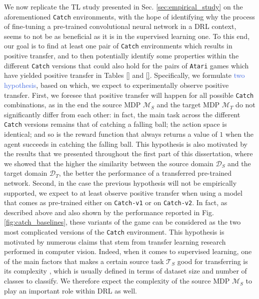 We now replicate the TL study presented in Sec. \ref{sec:empirical_study} on the aforementioned \texttt{Catch} environments, with the hope of identifying why the process of fine-tuning a pre-trained convolutional neural network in a DRL context, seems to not be as beneficial as it is in the supervised learning one. To this end, our goal is to find at least one pair of \texttt{Catch} environments which results in positive transfer, and to then potentially identify some properties within the different \texttt{Catch} versions that could also hold for the pairs of \texttt{Atari} games which have yielded positive transfer in Tables \ref{} and \ref{}. Specifically, we formulate \textcolor{RoyalBlue}{two hypothesis}, based on which, we expect to experimentally observe positive transfer. First, we foresee that positive transfer will happen for all possible \texttt{Catch} combinations, as in the end the source MDP $\mathcal{M}_S$ and the target MDP $\mathcal{M}_T$ do not significantly differ from each other: in fact, the main task across the different \texttt{Catch} versions remains that of catching a falling ball; the action space is identical; and so is the reward function that always returns a value of $1$ when the agent succeeds in catching the falling ball. This hypothesis is also motivated by the results that we presented throughout the first part of this dissertation, where we showed that the higher the similarity between the source domain $\mathcal{D}_S$ and the target domain $\mathcal{D}_T$, the better the performance of a transferred pre-trained network. Second, in the case the previous hypothesis will not be empirically supported, we expect to at least observe positive transfer when using a model that comes as pre-trained either on \texttt{Catch-v1} or on \texttt{Catch-v2}. In fact, as described above and also shown by the performance reported in Fig. \ref{fig:catch_baselines}, these variants of the game can be considered as the two most complicated versions of the \texttt{Catch} environment. This hypothesis is motivated by numerous claims that stem from transfer learning research performed in computer vision. Indeed, when it comes to supervised learning, one of the main factors that makes a certain source task $\mathcal{T}_S$ good for transferring is its complexity \cite{}, which is usually defined in terms of dataset size and number of classes to classify. We therefore expect the complexity of the source MDP $\mathcal{M}_S$ to play an important role within DRL as well.

